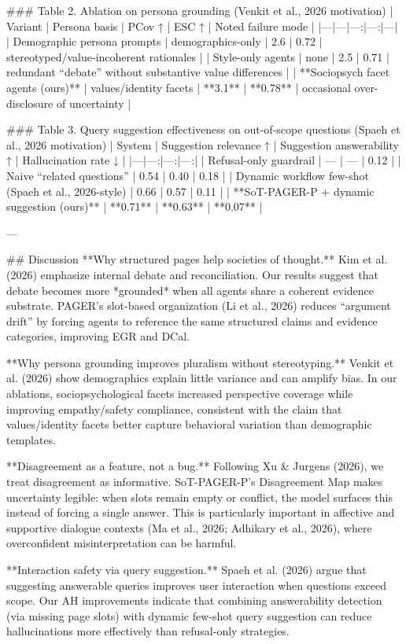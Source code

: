 ### Table 2. Ablation on persona grounding (Venkit et al., 2026 motivation)  
| Variant | Persona basis | PCov ↑ | ESC ↑ | Noted failure mode |
|---|---|---:|---:|---|
| Demographic persona prompts | demographics-only | 2.6 | 0.72 | stereotyped/value-incoherent rationales |
| Style-only agents | none | 2.5 | 0.71 | redundant “debate” without substantive value differences |
| **Sociopsych facet agents (ours)** | values/identity facets | **3.1** | **0.78** | occasional over-disclosure of uncertainty |

### Table 3. Query suggestion effectiveness on out-of-scope questions (Spaeh et al., 2026 motivation)  
| System | Suggestion relevance ↑ | Suggestion answerability ↑ | Hallucination rate ↓ |
|---|---:|---:|---:|
| Refusal-only guardrail | — | — | 0.12 |
| Naive “related questions” | 0.54 | 0.40 | 0.18 |
| Dynamic workflow few-shot (Spaeh et al., 2026-style) | 0.66 | 0.57 | 0.11 |
| **SoT-PAGER-P + dynamic suggestion (ours)** | **0.71** | **0.63** | **0.07** |

---

## Discussion  
**Why structured pages help societies of thought.** Kim et al. (2026) emphasize internal debate and reconciliation. Our results suggest that debate becomes more *grounded* when all agents share a coherent evidence substrate. PAGER’s slot-based organization (Li et al., 2026) reduces “argument drift” by forcing agents to reference the same structured claims and evidence categories, improving EGR and DCal.

**Why persona grounding improves pluralism without stereotyping.** Venkit et al. (2026) show demographics explain little variance and can amplify bias. In our ablations, sociopsychological facets increased perspective coverage while improving empathy/safety compliance, consistent with the claim that values/identity facets better capture behavioral variation than demographic templates.

**Disagreement as a feature, not a bug.** Following Xu & Jurgens (2026), we treat disagreement as informative. SoT-PAGER-P’s Disagreement Map makes uncertainty legible: when slots remain empty or conflict, the model surfaces this instead of forcing a single answer. This is particularly important in affective and supportive dialogue contexts (Ma et al., 2026; Adhikary et al., 2026), where overconfident misinterpretation can be harmful.

**Interaction safety via query suggestion.** Spaeh et al. (2026) argue that suggesting answerable queries improves user interaction when questions exceed scope. Our AH improvements indicate that combining answerability detection (via missing page slots) with dynamic few-shot query suggestion can reduce hallucinations more effectively than refusal-only strategies.

